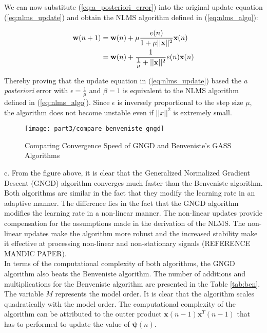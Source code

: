 \noindent{}We can now substitute (\ref{eq:a_posteriori_error}) into the original update equation (\ref{eq:nlms_update}) and obtain the NLMS algorithm defined in (\ref{eq:nlms_algo}):

\begin{align}
\textbf{w}(n+1) &= \textbf{w}(n) + \mu \frac{e(n)}{1+\mu ||\textbf{\textbf{x}}||^2}\textbf{x}(n) \nonumber\\
&= \textbf{w}(n) + \frac{1}{\frac{1}{\mu}+ ||\textbf{\textbf{x}}||^2}e(n)\textbf{x}(n) 
\end{align}

\noindent{}Thereby proving that the update equation in (\ref{eq:nlms_update}) based the \textit{a posteriori} error with $\epsilon=\frac{1}{\mu}$ and $\beta=1$ is equivalent to the NLMS algorithm defined in (\ref{eq:nlms_algo}). Since $\epsilon$ is inversely proportional to the step size $\mu$, the algorithm does not become unstable even if $||x||^2$ is extremely small.

\begin{figure}[H]
\centering{}
\texttt{[image: part3/compare\_benveniste\_gngd]}
\caption{Comparing Convergence Speed of GNGD and Benveniste's GASS Algorithms}
\end{figure}

\noindent{}c. From the figure above, it is clear that the Generalized Normalized Gradient Descent (GNGD) algorithm converges much faster than the Benveniste algorithm. Both algorithms are similar in the fact that they modify the learning rate in an adaptive manner. The difference lies in the fact that the GNGD algorithm modifies the learning rate in a non-linear manner. The non-linear updates provide compensation for the assumptions made in the derivation of the NLMS. The non-linear updates make the algorithm more robust and the increased stability make it effective at processing non-linear and non-stationary signals (REFERENCE MANDIC PAPER).\\

\noindent{}In terms of the computational complexity of both algorithms, the GNGD algorithm also beats the Benveniste algorithm. The number of additions and multiplications for the Benveniste algorithm are presented in the Table \ref{tab:ben}. The variable $M$ represents the model order. It is clear that the algorithm scales quadratically with the model order. The computational complexity of the algorithm can be attributed to the outter product $\textbf{x}(n-1)\textbf{x}^T(n-1)$ that has to performed to update the value of $\bm{\psi}(n)$. 

